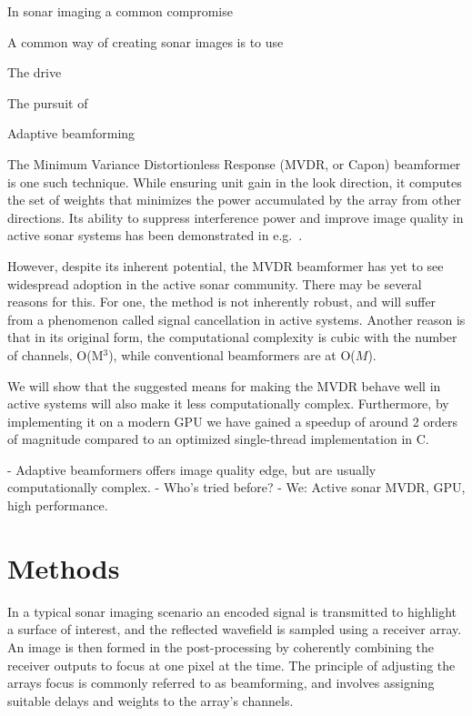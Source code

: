 \documentclass[12pt,journal,captionsoff,onecolumn]{IEEEtran}
\newcommand\1{\vec 1}
\begin{document}
In sonar imaging a common compromise 

A common way of creating sonar images is to use 

The drive 

The pursuit of 

Adaptive beamforming 


The Minimum Variance Distortionless Response (MVDR, or Capon) beamformer is one such technique. While ensuring unit gain in the look direction, it computes the set of weights that minimizes the power accumulated by the array from other directions. Its ability to suppress interference power and improve image quality in active sonar systems has been demonstrated in e.g.~\cite{Blomberg2012a,Blomberg2011,Dursun2009,Lo2004}.

However, despite its inherent potential, the \gls{MVDR} beamformer has yet to see widespread adoption in the active sonar community. There may be several reasons for this. For one, the method is not inherently robust, and will suffer from a phenomenon called signal cancellation in active systems. Another reason is that in its original form, the computational complexity is cubic with the number of channels, O(M$^3$), while conventional beamformers are at O($M$).

We will show that the suggested means for making the \gls{MVDR} behave well in active systems will also make it less computationally complex. Furthermore, by implementing it on a modern \gls{GPU} we have gained a speedup of around 2 orders of magnitude compared to an optimized single-thread implementation in C.



- Adaptive beamformers offers image quality edge, but are usually computationally complex.
- Who's tried before?
- We: Active sonar MVDR, GPU, high performance.


\section{Methods}\label{methods}

In a typical sonar imaging scenario an encoded signal is transmitted to highlight a surface of interest, and the reflected wavefield is sampled using a receiver array. An image is then formed in the post-processing by coherently combining the receiver outputs to focus at one pixel at the time. The principle of adjusting the arrays focus is commonly referred to as beamforming, and involves assigning suitable delays and weights to the array's channels.
\end{document}
